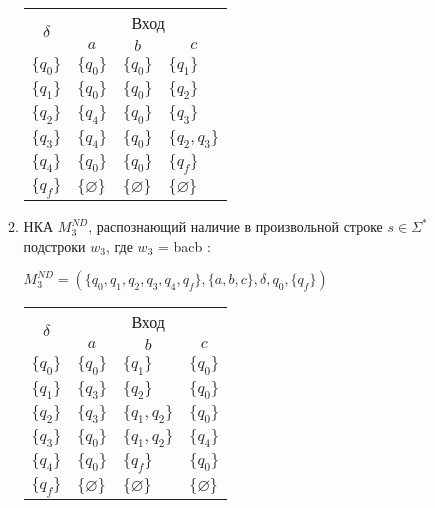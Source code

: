\begin{enumerate}[label=(\roman{*})]
\begin{enumerate}
		\begin{center}
			\begin{tabular}{llll}
				\toprule
				\multicolumn{1}{c}{\multirow{2}{*}{\Large $\delta$}}
				& \multicolumn{3}{c}{Вход} \\
				\cmidrule(rl){2-4}
				& \multicolumn{1}{c}{$a$}
				& \multicolumn{1}{c}{$b$} 
				& \multicolumn{1}{c}{$c$} \\
				\midrule
				$\{q_0\}$       & $\{q_0\}$      		 & $\{q_0\}$     &$\{q_1\}$  \\
				$\{q_1\}$       & $\{q_0\}$    			 & $\{q_0\}$     &$\{q_2\}$ \\
				$\{q_2\}$       & $\{q_4\}$    			 & $\{q_0\}$     &$\{q_3\}$  \\
				$\{q_3\}$       & $\{q_4\}$    			 & $\{q_0\}$     &$\{q_2, q_3\}$  \\
				$\{q_4\}$       & $\{q_0\}$    			 & $\{q_0\}$     &$\{q_f\}$  \\
				$\{q_f\}$       & $\{\varnothing\}$    	 & $\{\varnothing\}$     &$\{\varnothing\}$  \\
				\bottomrule
			\end{tabular}
		\end{center}
		
		
		\item НКА $M^{ND}_3$, распознающий наличие в произвольной строке $s \in \Sigma^*$ подстроки $w_3$, где $w_3$ = bacb :
		
		$M^{ND}_3 = (\{q_0, q_1, q_2, q_3, q_4, q_f\}, \{a, b, c\}, \delta, q_0, \{q_f\})$
		
		\begin{center}
			\begin{tabular}{llll}
				\toprule
				\multicolumn{1}{c}{\multirow{2}{*}{\Large $\delta$}}
				& \multicolumn{3}{c}{Вход} \\
				\cmidrule(rl){2-4}
				& \multicolumn{1}{c}{$a$}
				& \multicolumn{1}{c}{$b$} 
				& \multicolumn{1}{c}{$c$} \\
				\midrule
				$\{q_0\}$       & $\{q_0\}$      		 & $\{q_1\}$     &$\{q_0\}$  \\
				$\{q_1\}$       & $\{q_3\}$    			 & $\{q_2\}$     &$\{q_0\}$ \\
				$\{q_2\}$       & $\{q_3\}$    			 & $\{q_1, q_2\}$     &$\{q_0\}$  \\
				$\{q_3\}$       & $\{q_0\}$    			 & $\{q_1, q_2\}$     &$\{q_4\}$  \\
				$\{q_4\}$       & $\{q_0\}$    			 & $\{q_f\}$     &$\{q_0\}$  \\
				$\{q_f\}$       & $\{\varnothing\}$    	 & $\{\varnothing\}$     &$\{\varnothing\}$  \\
				\bottomrule
			\end{tabular}
		\end{center}
		

\end{enumerate}
\end{enumerate}
